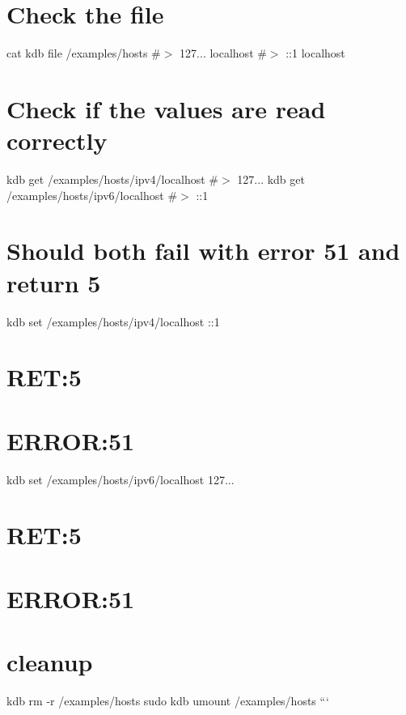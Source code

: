 \section*{Check the file}

cat {\ttfamily kdb file /examples/hosts} \#$>$ 127... localhost \#$>$ \+:\+:1 localhost

\section*{Check if the values are read correctly}

kdb get /examples/hosts/ipv4/localhost \#$>$ 127... kdb get /examples/hosts/ipv6/localhost \#$>$ \+:\+:1

\section*{Should both fail with error 51 and return 5}

kdb set /examples/hosts/ipv4/localhost \+:\+:1 \section*{R\+ET\+:5}

\section*{E\+R\+R\+OR\+:51}

kdb set /examples/hosts/ipv6/localhost 127... \section*{R\+ET\+:5}

\section*{E\+R\+R\+OR\+:51}

\section*{cleanup}

kdb rm -\/r /examples/hosts sudo kdb umount /examples/hosts ``` 
